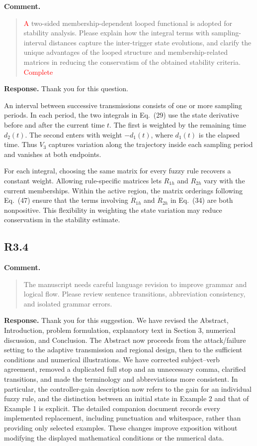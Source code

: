 \documentclass[12pt,a4paper]{article}
\begin{document}
\textbf{Comment.}
\begin{quote}
\raggedright
\textcolor{red}{A} two-sided membership-dependent looped functional is adopted for stability analysis. Please explain how the integral terms with sampling-interval distances capture the inter-trigger state evolutions, and clarify the unique advantages of the looped structure and membership-related matrices in reducing the conservatism of the obtained stability criteria. \textcolor{red}{Complete}
\end{quote}

\textbf{Response.}
Thank you for this question.\par
{\setlength{\parskip}{5pt}\indent An interval between successive transmissions consists of one or more sampling periods. In each period, the two integrals in Eq.~(29) use the state derivative before and after the current time $t$. The first is weighted by the remaining time $d_2(t)$. The second enters with weight $-d_1(t)$, where $d_1(t)$ is the elapsed time. Thus $V_3$ captures variation along the trajectory inside each sampling period and vanishes at both endpoints.\par
\indent For each integral, choosing the same matrix for every fuzzy rule recovers a constant weight. Allowing rule-specific matrices lets $R_{1h}$ and $R_{2h}$ vary with the current memberships. Within the active region, the matrix orderings following Eq.~(47) ensure that the terms involving $\dot R_{1h}$ and $\dot R_{2h}$ in Eq.~(34) are both nonpositive. This flexibility in weighting the state variation may reduce conservatism in the stability estimate.\par}

\subsection*{R3.4}

\textbf{Comment.}
\begin{quote}
\raggedright
The manuscript needs careful language revision to improve grammar and logical flow. Please review sentence transitions, abbreviation consistency, and isolated grammar errors.
\end{quote}

\textbf{Response.}
Thank you for this suggestion. We have revised the Abstract, Introduction, problem formulation, explanatory text in Section 3, numerical discussion, and Conclusion. The Abstract now proceeds from the attack/failure setting to the adaptive transmission and regional design, then to the sufficient conditions and numerical illustrations. We have corrected subject–verb agreement, removed a duplicated full stop and an unnecessary comma, clarified transitions, and made the terminology and abbreviations more consistent. In particular, the controller-gain description now refers to the gain for an individual fuzzy rule, and the distinction between an initial state in Example 2 and that of Example 1 is explicit. The detailed companion document records every implemented replacement, including punctuation and whitespace, rather than providing only selected examples. These changes improve exposition without modifying the displayed mathematical conditions or the numerical data.
\end{document}
